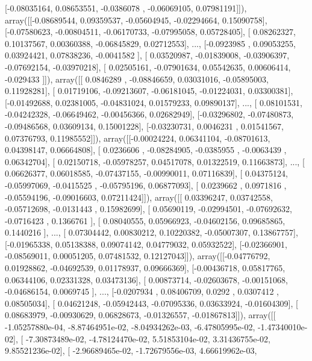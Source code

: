 \documentclass{article}
\begin{document}
       [-0.08035164,  0.08653551, -0.0386078 , -0.06069105,  0.07981191]]), array([[-0.08689544,  0.09359537, -0.05604945, -0.02294664,  0.15090758],
       [-0.07580623, -0.00804511, -0.06170733, -0.07995058,  0.05728405],
       [ 0.08262327,  0.10137567,  0.00360388, -0.06845829,  0.02712553],
       ..., 
       [-0.0923985 ,  0.09053255,  0.03924421,  0.07838236, -0.0041582 ],
       [ 0.03520987, -0.01839008, -0.03906397, -0.07692154, -0.03970218],
       [ 0.02505161, -0.07901634,  0.05542635,  0.00606414, -0.029433  ]]), array([[ 0.0846289 , -0.08846659,  0.03031016, -0.05895003,  0.11928281],
       [ 0.01719106, -0.09213607, -0.06181045, -0.01224031,  0.03300381],
       [-0.01492688,  0.02381005, -0.04831024,  0.01579233,  0.09890137],
       ..., 
       [ 0.08101531, -0.04242328, -0.06649462, -0.00456366,  0.02682949],
       [-0.03296802, -0.07480873, -0.09486568,  0.03609134,  0.15001228],
       [-0.03230731,  0.0046231 ,  0.01541567,  0.07376793,  0.11985552]]), array([[-0.00024224,  0.06341104, -0.08701613,  0.04398147,  0.06664808],
       [ 0.0236606 , -0.08284905, -0.0385955 , -0.0063439 ,  0.06342704],
       [ 0.02150718, -0.05978257,  0.04517078,  0.01322519,  0.11663873],
       ..., 
       [ 0.06626377,  0.06018585, -0.07437155, -0.00990011,  0.07116839],
       [ 0.04375124, -0.05997069, -0.0415525 , -0.05795196,  0.06877093],
       [ 0.0239662 ,  0.0971816 , -0.05594196, -0.09016603,  0.07211424]]), array([[ 0.03396247,  0.03742558, -0.05712698, -0.0131443 ,  0.15982699],
       [ 0.05690119, -0.02994501, -0.07692632, -0.0716423 ,  0.1366761 ],
       [ 0.08040555,  0.05966923, -0.04602156,  0.09685865,  0.1440216 ],
       ..., 
       [ 0.07304442,  0.00830212,  0.10220382, -0.05007307,  0.13867757],
       [-0.01965338,  0.05138388,  0.09074142,  0.04779032,  0.05932522],
       [-0.02366901, -0.08569011,  0.00051205,  0.07481532,  0.12127043]]), array([[-0.04776792,  0.01928862, -0.04692539,  0.01178937,  0.09666369],
       [-0.00436718,  0.05817765,  0.06344106,  0.02331328,  0.03473136],
       [ 0.00873714, -0.02603678, -0.00151068, -0.04686154,  0.0069745 ],
       ..., 
       [-0.0207934 ,  0.08406709,  0.0292    ,  0.0307412 ,  0.08505034],
       [ 0.04621248, -0.05942443, -0.07095336,  0.03633924, -0.01604309],
       [ 0.08683979, -0.00930629,  0.06828673, -0.01326557, -0.01867813]]), array([[ -1.05257880e-04,  -8.87464951e-02,  -8.04934262e-03,
         -6.47805995e-02,  -1.47340010e-02],
       [ -7.30873489e-02,  -4.78124470e-02,   5.51853104e-02,
          3.31436755e-02,   9.85521236e-02],
       [ -2.96689465e-02,  -1.72679556e-03,   4.66619962e-03,
\end{document}
